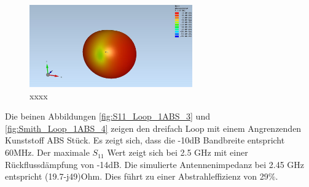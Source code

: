 \begin{figure}[h]
	\centering
	\includegraphics[width=7cm]{content/bilder/Evaluation/Loop/ohneABS/EM_Far_Field_Loop_Coil_ohneABS.JPG}%
	\caption{xxxx}
	\label{xxx}
\end{figure}


Die beinen Abbildungen \ref{fig:S11_Loop_1ABS_3} und \ref{fig:Smith_Loop_1ABS_4} zeigen den dreifach Loop mit einem Angrenzenden Kunststoff ABS Stück. Es zeigt sich, dass die -10dB Bandbreite entspricht 60MHz. Der maximale $S_{11}$ Wert zeigt sich bei 2.5 GHz mit einer Rückflussdämpfung von -14dB. Die simulierte Antennenimpedanz bei 2.45 GHz entspricht (19.7-j49)Ohm. Dies führt zu einer Abstrahleffizienz von 29$\%$.

